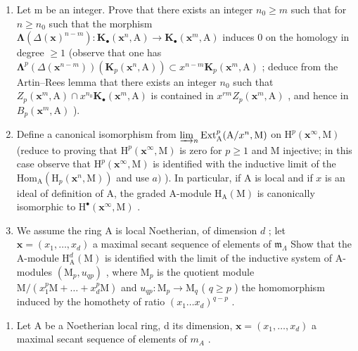 \begin{enumerate}
\def\labelenumi{\alph{enumi})}
\item
  Let m be an integer. Prove that there exists an integer \(n_{0} \geqslant m\) such that for \(n \geqslant n_{0}\) such that the morphism \(\boldsymbol{\Lambda}(\Delta(\mathbf{x})^{n-m}) : \mathbf{K}_{\bullet}(\mathbf{x}^{n}, \mathrm{A}) \longrightarrow \mathbf{K}_{\bullet}(\mathbf{x}^{m}, \mathrm{A})\) induces 0 on the homology in degree \(\geqslant 1\) (observe that one has \(\boldsymbol{\Lambda}^{p}(\Delta(\mathbf{x}^{n-m}))(\mathbf{K}_{p}(\mathbf{x}^{n}, \mathrm{A})) \subset x^{n-m}\mathbf{K}_{p}(\mathbf{x}^{m}, \mathrm{A})\) ; deduce from the Artin–Rees lemma that there exists an integer \(n_{0}\) such that \(Z_{p}(\mathbf{x}^{m}, \mathrm{A}) \cap x^{n_{0}}\mathbf{K}_{\bullet}(\mathbf{x}^{m}, \mathrm{A})\) is contained in \(x^{rm}Z_{p}(\mathbf{x}^{m}, \mathrm{A})\) , and hence in \(B_{p}(\mathbf{x}^{m}, \mathrm{A})\) ).
\item
  Define a canonical isomorphism from \(\varinjlim_{n}\mathrm{Ext}_{\mathrm{A}}^{p}(\mathrm{A}/x^{n},\mathrm{M})\) on \(\mathrm{H}^p (\mathbf{x}^\infty ,\mathrm{M})\) (reduce to proving that \(\mathrm{H}^p (\mathbf{x}^\infty ,\mathrm{M})\) is zero for \(p\geqslant 1\) and M injective; in this case observe that \(\mathrm{H}^p (\mathbf{x}^\infty ,\mathrm{M})\) is identified with the inductive limit of the \(\mathrm{Hom}_{\mathrm{A}}(\mathrm{H}_p(\mathbf{x}^n,\mathrm{M}))\) and use \(a)\) ). In particular, if A is local and if \(x\) is an ideal of definition of A, the graded A-module \(\mathrm{H}_{\mathrm{A}}(\mathrm{M})\) is canonically isomorphic to \(\mathrm{H}^{\bullet}(\mathbf{x}^{\infty},\mathrm{M})\) .
\item
  We assume the ring A is local Noetherian, of dimension \(d\) ; let \(\mathbf{x} = (x_{1},\ldots ,x_{d})\) a maximal secant sequence of elements of \(\mathfrak{m}_{\Lambda}\) Show that the A-module \(\mathrm{H}_{\mathrm{A}}^{d}(\mathrm{M})\) is identified with the limit of the inductive system of A-modules \((\mathrm{M}_p,u_{qp})\) , where \(\mathrm{M}_p\) is the quotient module \(\mathrm{M} / (x_1^p\mathrm{M} + \dots +x_d^p\mathrm{M})\) and \(u_{qp}:\mathrm{M}_p\to \mathrm{M}_q\) ( \(q\geqslant p\) ) the homomorphism induced by the homothety of ratio \((x_{1}\dots x_{d})^{q - p}\) .
\end{enumerate}

\begin{enumerate}
\def\labelenumi{\arabic{enumi})}
\setcounter{enumi}{8}
\tightlist
\item
  Let A be a Noetherian local ring, d its dimension, \(\mathbf{x} = (x_{1}, \ldots, x_{d})\) a maximal secant sequence of elements of \(m_{A}\) .
\end{enumerate}

